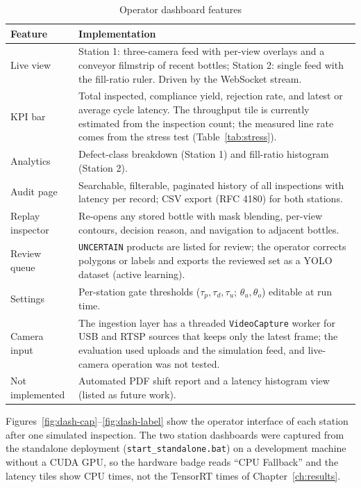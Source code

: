 \begin{table}[htbp]
\centering
\caption{Operator dashboard features}
\label{tab:dashboard}
\begin{tabularx}{\textwidth}{|L{3.2cm}|X|}
\hline
\textbf{Feature} & \textbf{Implementation} \\ \hline
Live view & Station 1: three-camera feed with per-view overlays and a conveyor filmstrip of recent bottles; Station 2: single feed with the fill-ratio ruler. Driven by the WebSocket stream. \\ \hline
KPI bar & Total inspected, compliance yield, rejection rate, and latest or average cycle latency. The throughput tile is currently estimated from the inspection count; the measured line rate comes from the stress test (Table~\ref{tab:stress}). \\ \hline
Analytics & Defect-class breakdown (Station 1) and fill-ratio histogram (Station 2). \\ \hline
Audit page & Searchable, filterable, paginated history of all inspections with latency per record; CSV export (RFC 4180) for both stations. \\ \hline
Replay inspector & Re-opens any stored bottle with mask blending, per-view contours, decision reason, and navigation to adjacent bottles. \\ \hline
Review queue & \texttt{UNCERTAIN} products are listed for review; the operator corrects polygons or labels and exports the reviewed set as a YOLO dataset (active learning). \\ \hline
Settings & Per-station gate thresholds ($\tau_p,\tau_d,\tau_u$; $\theta_u,\theta_o$) editable at run time. \\ \hline
Camera input & The ingestion layer has a threaded \texttt{VideoCapture} worker for USB and RTSP sources that keeps only the latest frame; the evaluation used uploads and the simulation feed, and live-camera operation was not tested. \\ \hline
Not implemented & Automated PDF shift report and a latency histogram view (listed as future work). \\ \hline
\end{tabularx}
\end{table}

Figures~\ref{fig:dash-cap}--\ref{fig:dash-label} show the operator interface of each station after one simulated inspection. The two station dashboards were captured from the standalone deployment (\texttt{start\_standalone.bat}) on a development machine without a CUDA GPU, so the hardware badge reads ``CPU Fallback'' and the latency tiles show CPU times, not the TensorRT times of Chapter~\ref{ch:results}.

